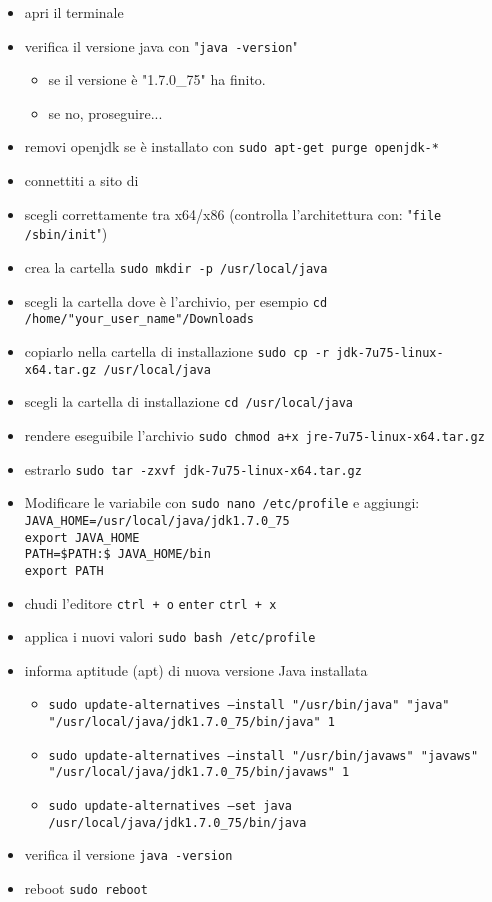 \documentclass{article}
\begin{document}
\begin{itemize}
\item apri il terminale
\item  verifica il versione java con "\texttt{java -version}"
\begin{itemize}
\item se il versione \`e "1.7.0\_75" ha finito.
\item se no, proseguire...
\end{itemize}
\item removi openjdk se \`e installato con \texttt{sudo apt-get purge openjdk-*}
\item connettiti a sito di
  \href{http://www.oracle.com/technetwork/java/javase/downloads/jdk7-downloads-1880260.html}{}
\item scegli correttamente tra x64/x86 (controlla l'architettura con:  "\texttt{file /sbin/init}")
\item crea la cartella \texttt{sudo mkdir -p /usr/local/java}
\item scegli la cartella dove \`e l'archivio, per esempio \texttt{cd /home/"your\_user\_name"/Downloads}
\item copiarlo nella cartella di installazione	\texttt{sudo cp -r jdk-7u75-linux-x64.tar.gz /usr/local/java}
\item scegli la cartella di installazione \texttt{cd /usr/local/java}
\item rendere eseguibile l'archivio \texttt{sudo chmod a+x jre-7u75-linux-x64.tar.gz}
\item estrarlo \texttt{sudo tar -zxvf jdk-7u75-linux-x64.tar.gz}
\item Modificare le variabile con \texttt{sudo nano /etc/profile}  e
  aggiungi: \\
\texttt{JAVA\_HOME=/usr/local/java/jdk1.7.0\_75} \\
\texttt{export JAVA\_HOME}\\
\texttt{PATH=\$PATH:\$ JAVA\_HOME/bin}\\
\texttt{export PATH}
\item chudi l'editore \texttt{ctrl + o} \texttt{enter} \texttt{ctrl + x}
\item applica i nuovi valori \texttt{sudo bash /etc/profile}
\item informa aptitude (apt) di nuova versione Java installata
\begin{itemize}
\item \texttt{sudo update-alternatives --install "/usr/bin/java" "java" "/usr/local/java/jdk1.7.0\_75/bin/java" 1}
\item \texttt{sudo update-alternatives --install "/usr/bin/javaws" "javaws" "/usr/local/java/jdk1.7.0\_75/bin/javaws" 1}
\item \texttt{sudo update-alternatives --set java /usr/local/java/jdk1.7.0\_75/bin/java}
\end{itemize} 
\item verifica il versione \texttt{java -version}
\item reboot \texttt{sudo reboot}
\end{itemize}
\end{document}
